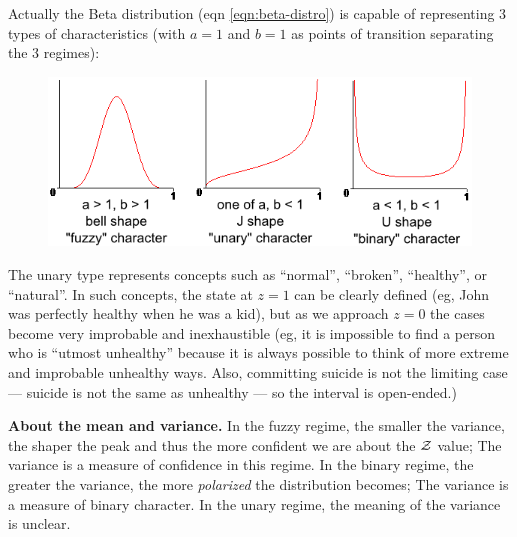 Actually the Beta distribution (eqn \ref{eqn:beta-distro}) is capable of representing 3 types of characteristics (with $a = 1$ and $b = 1$ as points of transition separating the 3 regimes):
\begin{figure}[H]
\centering
\includegraphics[scale=0.8]{binary-fuzzy-unary-characters.png}
\end{figure}
The unary type represents concepts such as ``normal'', ``broken'', ``healthy'', or ``natural''.  In such concepts, the state at $z = 1$ can be clearly defined (eg, John was perfectly healthy when he was a kid), but as we approach $z = 0$ the cases become very improbable and inexhaustible (eg, it is impossible to find a person who is ``utmost unhealthy'' because it is always possible to think of more extreme and improbable unhealthy ways.  Also, committing suicide is not the limiting case --- suicide is not the same as unhealthy --- so the interval is open-ended.)

\textbf{About the mean and variance.}  In the fuzzy regime, the smaller the variance, the shaper the peak and thus the more confident we are about the $\mathcal{Z}$ value;  The variance is a measure of confidence in this regime.  In the binary regime, the greater the variance, the more \textit{polarized} the distribution becomes;  The variance is a measure of binary character.  In the unary regime, the meaning of the variance is unclear.



